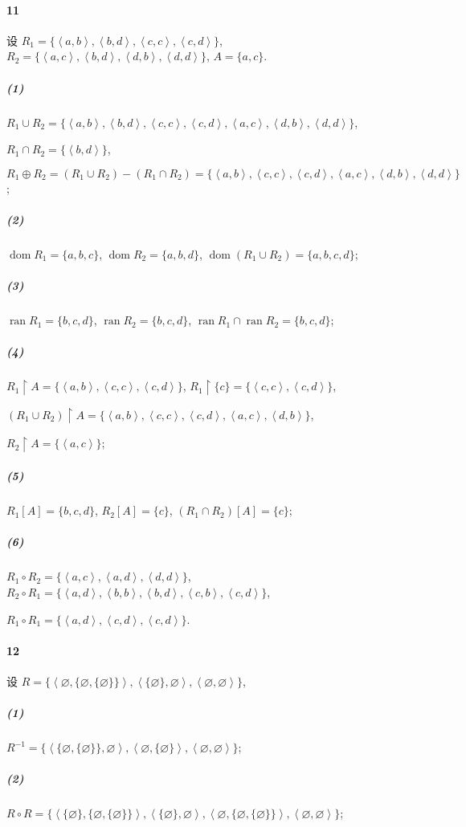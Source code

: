 \documentclass{ctexart}
\def\pair#1{\left\langle #1 \right\rangle}
\def\restr{\mathbin{\upharpoonright}}
\DeclareMathOperator{\dom}{dom}
\DeclareMathOperator{\ran}{ran}
\begin{document}
\paragraph*{11} 设 $R_1=\{\pair{a,b}, \pair{b,d},\pair{c,c}, \pair{c,d}\}$,
$R_2=\{\pair{a,c}, \pair{b,d},\pair{d,b}, \pair{d,d}\}$, $A=\{a,c\}$.

\subparagraph*{(1)} $R_1\cup R_2=\{\pair{a,b}, \pair{b,d}, \pair{c,c}, \pair{c,d}, \pair{a,c}, \pair{d,b}, \pair{d,d}\}$,

$R_1\cap R_2=\{\pair{b,d}\}$,

$R_1\oplus R_2 = (R_1\cup R_2) - (R_1\cap R_2) = \{\pair{a,b}, \pair{c,c}, \pair{c,d},\pair{a,c}, \pair{d,b}, \pair{d,d}\}$;

\subparagraph*{(2)} $\dom R_1 = \{a,b,c\}$,
$\dom R_2 = \{a,b,d\}$,
$\dom (R_1\cup R_2) = \{a,b,c,d\}$;

\subparagraph*{(3)} $\ran R_1 = \{b,c,d\}$,
$\ran R_2 = \{b,c,d\}$,
$\ran R_1 \cap \ran R_2 = \{b,c,d\}$;

\subparagraph*{(4)} $R_1\restr A = \{\pair{a,b}, \pair{c,c}, \pair{c,d}\}$,
$R_1\restr \{c\} = \{\pair{c,c}, \pair{c,d}\}$,

$(R_1\cup R_2)\restr A = \{\pair{a,b}, \pair{c,c}, \pair{c,d}, \pair{a,c}, \pair{d,b}\}$,

$R_2\restr A = \{\pair{a,c}\}$;

\subparagraph*{(5)} $R_1[A] = \{b,c,d\}$,
$R_2[A] = \{c\}$,
$(R_1\cap R_2)[A]=\{c\}$;

\subparagraph*{(6)} $R_1\circ R_2=\{\pair{a,c}, \pair{a,d}, \pair{d,d}\}$,
$R_2\circ R_1=\{\pair{a,d},\pair{b,b},\pair{b,d},\pair{c,b},\pair{c,d}\}$,

$R_1\circ R_1=\{\pair{a,d},\pair{c,d}, \pair{c,d}\}$.

\paragraph*{12} 设 $R=\{\pair{\varnothing, \{\varnothing, \{\varnothing\}\}}, \pair{\{\varnothing\},\varnothing}, \pair{\varnothing, \varnothing}\}$,

\subparagraph*{(1)} $R^{-1} = \{\pair{\{\varnothing, \{\varnothing\}\}, \varnothing}, \pair{\varnothing,\{\varnothing\}}, \pair{\varnothing, \varnothing}\}$;

\subparagraph*{(2)} $R\circ R = \{\pair{\{\varnothing\}, \{\varnothing, \{\varnothing\}\}}, \pair{\{\varnothing\}, \varnothing }, \pair{\varnothing, \{\varnothing, \{\varnothing\}\}}, \pair{\varnothing, \varnothing}\}$;
\end{document}

